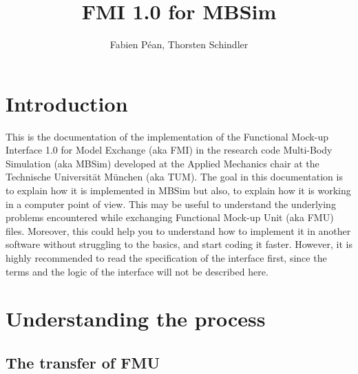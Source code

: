 \documentclass[10pt,a4paper]{report}
\author{Fabien Péan, Thorsten Schindler}
\title{FMI 1.0 for MBSim}
\begin{document}
\maketitle

\begingroup
\let\cleardoublepage\relax
\let\clearpage\relax
\tableofcontents
\chapter*{Introduction}
This is the documentation of the implementation of the Functional Mock-up Interface 1.0 for Model Exchange (aka FMI) in the research code Multi-Body Simulation (aka MBSim) developed at the Applied Mechanics chair at the Technische Universität München (aka TUM). The goal in this documentation is to explain how it is implemented in MBSim but also, to explain how it is working in a computer point of view. This may be useful to understand the underlying problems encountered while exchanging Functional Mock-up Unit (aka FMU) files. Moreover, this could help you to understand how to implement it in another software without struggling to the basics, and start coding it faster. However, it is highly recommended to read the specification of the interface first, since the terms and the logic of the interface will not be described here.
\endgroup
%
\chapter{Understanding the process}
%
\section{The transfer of FMU}
%
\end{document}
